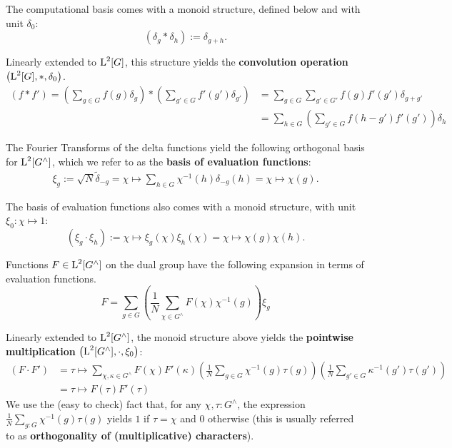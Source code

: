 The computational basis comes with a monoid structure, defined below and with unit $\delta_0$:
\begin{equation*}
  \left(\delta_g*\delta_h\right):=\delta_{g+h}.
\end{equation*}

Linearly extended to $\operatorname{L}^2[G]$, this structure yields the \textbf{convolution operation} $\left( \operatorname{L}^2[G],*,\delta_0 \right)$.
\begin{align}
\label{eqn_convolutionOperation}
  \left(f * f'\right) = \left(\sum_{g\in G} f(g) \delta_g \right) * \left( \sum_{g' \in  G} f'(g') \delta_{g'} \right) &= \sum_{g\in G} \sum_{g'\in G'} f(g) f'(g') \delta_{g+g'} \\ &= \sum_{h\in G} \left(\sum_{g'\in G} f(h-g') f'(g')\right) \delta_h
\end{align}

The Fourier Transforms of the delta functions yield the following orthogonal basis for $\operatorname{L}^2[G^\wedge]$, which we refer to as the \textbf{basis of evaluation functions}:
\begin{align*}
\xi_{g} := \sqrt{N}\tilde{\delta}_{-g} = \chi \mapsto \sum_{h \in G}\chi^{-1}(h)\delta_{-g}(h) = \chi \mapsto \chi(g).
\end{align*}

The basis of evaluation functions also comes with a monoid structure, with unit $\xi_0: \chi \mapsto 1$:
\begin{equation*}
  \left(\xi_g\cdot\xi_h\right):= \chi \mapsto \xi_g(\chi)\xi_h(\chi) = \chi \mapsto \chi(g)\chi(h).
\end{equation*}

Functions $F \in \operatorname{L}^2[G^\wedge]$ on the dual group have the following expansion in terms of evaluation functions.
\begin{equation*}
  F = \sum_{g\in G} \left( \frac{1}{N}\sum_{\chi \in G^\wedge} F(\chi) \chi^{-1}(g) \right) \xi_g
\end{equation*}

Linearly extended to $\operatorname{L}^2[G^\wedge]$, the monoid structure above yields the \textbf{pointwise multiplication} $\left( \operatorname{L}^2[G^\wedge],\cdot,\xi_0 \right)$: 
\begin{align}
\label{eqn_PointwiseMultCharacters}
  \left(F \cdot F' \right) &= \tau \mapsto \sum_{\chi,\kappa \in G^\wedge}  F(\chi)  F'(\kappa) \left(\frac{1}{N} \sum_{g\in G} \chi^{-1}(g)\tau(g)\right) \left(\frac{1}{N} \sum_{g'\in G}\kappa^{-1}(g') \tau(g') \right) \\ &= \tau \mapsto F(\tau) F'(\tau)
\end{align}
We use the (easy to check) fact that, for any $\chi,\tau : G^\wedge$, the expression $\frac{1}{N} \sum_{g:G}\chi^{-1}(g) \tau(g)$ yields $1$ if $\tau = \chi$ and $0$ otherwise (this is usually referred to as \textbf{orthogonality of (multiplicative) characters}).

